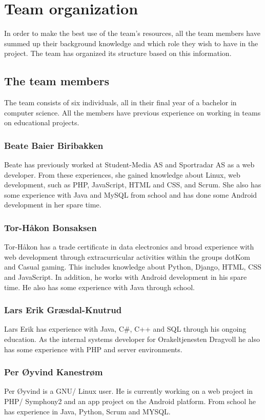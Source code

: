 \section{Team organization}
In order to make the best use of the team's resources, all the team members have summed up their background knowledge and which role they wish to have in the project. The team has organized its structure based on this information.

\subsection{The team members}
The team consists of six individuals, all in their final year of a bachelor in computer science. All the members have previous experience on working in teams on educational projects.

\subsubsection{Beate Baier Biribakken}
Beate has previously worked at Student-Media AS\cite{studentmedia} and Sportradar AS\cite{sportradar} as a web developer. From these experiences, she gained knowledge about Linux, web development, such as PHP, JavaScript, HTML and CSS, and Scrum. She also has some experience with Java and MySQL from school and has done some Android development in her spare time.

\subsubsection{Tor-Håkon Bonsaksen}
Tor-Håkon has a trade certificate in data electronics and broad experience with web development through extracurricular activities within the groups dotKom\cite{dotkom} and Casual gaming\cite{casualgaming}. This includes knowledge about Python, Django, HTML, CSS and JavaScript. In addition, he works with Android development in his spare time. He also has some experience with Java through school.

\subsubsection{Lars Erik Græsdal-Knutrud}
Lars Erik has experience with Java, C\#, C++ and SQL through his ongoing education. As the internal systems developer for Orakeltjenesten Dragvoll\cite{orakeltjenesten} he also has some experience with PHP and server environments. 

\subsubsection{Per Øyvind Kanestrøm}
Per Øyvind is a GNU/ Linux user. He is currently working on a web project in PHP/ Symphony2 and an app project on the Android platform. From school he has experience in Java, Python, Scrum and MYSQL.

